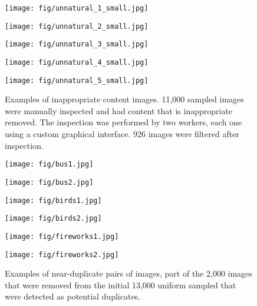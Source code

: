 \documentclass{article}
\begin{document}
\begin{figure*}[!ht]
\centering
\begin{minipage}{0.18\linewidth}
\centerline{\texttt{[image: fig/unnatural\_1\_small.jpg]}}
\end{minipage}
\begin{minipage}{0.18\linewidth}
\centerline{\texttt{[image: fig/unnatural\_2\_small.jpg]}}
\end{minipage}
\begin{minipage}{0.18\linewidth}
\centerline{\texttt{[image: fig/unnatural\_3\_small.jpg]}}
\end{minipage}
\begin{minipage}{0.18\linewidth}
\centerline{\texttt{[image: fig/unnatural\_4\_small.jpg]}}
\end{minipage}
\begin{minipage}{0.18\linewidth}
\centerline{\texttt{[image: fig/unnatural\_5\_small.jpg]}}
\end{minipage}
\caption{Examples of inappropriate content images. 11,000 sampled images were manually inspected and had content that is inappropriate removed. The inspection was performed by two workers, each one using a custom graphical interface. 926 images were filtered after inspection.}
\label{fig:unnatexample}
\end{figure*}

\begin{figure*}[!ht]
\centering
\begin{minipage}{0.16\linewidth}
\centerline{\texttt{[image: fig/bus1.jpg]}}
\end{minipage}
\begin{minipage}{0.16\linewidth}
\centerline{\texttt{[image: fig/bus2.jpg]}}
\end{minipage}
\begin{minipage}{0.16\linewidth}
\centerline{\texttt{[image: fig/birds1.jpg]}}
\end{minipage}
\begin{minipage}{0.16\linewidth}
\centerline{\texttt{[image: fig/birds2.jpg]}}
\end{minipage}
\begin{minipage}{0.16\linewidth}
\centerline{\texttt{[image: fig/fireworks1.jpg]}}
\end{minipage}
\begin{minipage}{0.16\linewidth}
\centerline{\texttt{[image: fig/fireworks2.jpg]}}
\end{minipage}
\caption{Examples of near-duplicate pairs of images, part of the 2,000 images that were removed from the initial 13,000 uniform sampled that were detected as potential duplicates.}
\label{fig:duplicates_examples}
\end{figure*}
\end{document}

